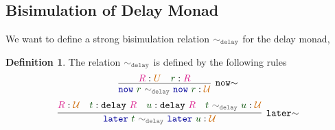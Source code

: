 \documentclass[twoside,11pt,openright]{report}
\theoremstyle{plain} %
\theoremstyle{definition}
\newtheorem{defn}[thm]{Definition}%
\theoremstyle{remark}
\newcommand*{\term}[1]{\textcolor{green!30!black}{#1}} %
\newcommand*{\type}[1]{\textcolor{magenta!90!black}{#1}}
\newcommand*{\universe}[1]{\textcolor{orange!80!black}{#1}}
\newcommand*{\relation}[1]{\textcolor{gray!75!black}{\ensuremath{\mathtt{#1}}}}
\newcommand*{\function}[1]{\textcolor{blue!60!black}{\ensuremath{\mathtt{#1}}}}
\newcommand*{\typeformer}[1]{\ensuremath{\mathtt{#1}}}
\begin{document}
\subsection{Bisimulation of Delay Monad}
We want to define a strong bisimulation relation \(\relation{\sim_{delay}}\) for the delay monad, 
\begin{defn}
  The relation \(\relation{\sim_{delay}}\) is defined by the following rules
  \begin{equation}
    \vcenter{\infer[\mathtt{now}{\sim}]{\function{now}~\term{r}~\relation{\sim_{delay}}~\function{now}~\term{r} : \universe{\mathcal{U}}}{\type{R} : \universe{U} & \term{r} : \type{R}}}
  \end{equation}
  \begin{equation}
    \vcenter{\infer[\mathtt{later}{\sim}]{\function{later}~\term{t}~\relation{\sim_{delay}}~\function{later}~\term{u} : \universe{\mathcal{U}}}{\type{R} : \universe{\mathcal{U}} & \term{t} : \typeformer{delay}~\type{R} & \term{u} : \typeformer{delay}~\type{R} & \term{t}~\relation{\sim_{delay}}~\term{u} : \universe{\mathcal{U}}}}
  \end{equation}
\end{defn}
\end{document}

